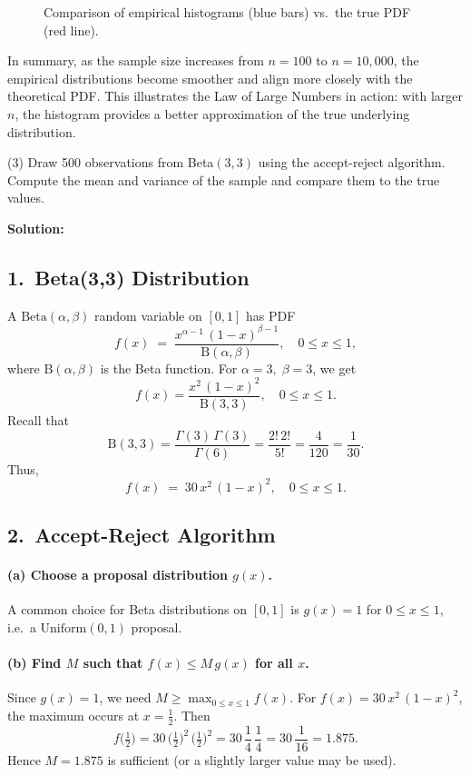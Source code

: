 \documentclass[final,11pt]{article}
\begin{document}
\begin{spacing}{1.25}
{\begin{figure}[htbp]
  \caption{Comparison of empirical histograms (blue bars) vs.\ the true PDF (red line).}
  \label{fig:comparison}
\end{figure}

In summary, as the sample size increases from \(n=100\) to \(n=10{,}000\), 
the empirical distributions become smoother and align more closely with the theoretical PDF. 
This illustrates the Law of Large Numbers in action: with larger \(n\), 
the histogram provides a better approximation of the true underlying distribution.

}




\newpage

(3) Draw 500 observations from Beta$(3,3)$ using the accept-reject algorithm. Compute the mean and variance of the sample and compare them to the true values.

{
\textbf{Solution:}


\subsection*{1.\, Beta(3,3) Distribution}
A $\mathrm{Beta}(\alpha,\beta)$ random variable on $[0,1]$ has PDF
\[
f(x) \;=\; \frac{x^{\alpha-1}\,(1-x)^{\beta-1}}{\mathrm{B}(\alpha,\beta)},
\quad 0 \le x \le 1,
\]
where $\mathrm{B}(\alpha,\beta)$ is the Beta function. For $\alpha=3,\;\beta=3$, we get
\[
f(x) 
= \frac{x^2\,(1-x)^2}{\mathrm{B}(3,3)},
\quad 0 \le x \le 1.
\]
Recall that
\[
\mathrm{B}(3,3)
= \frac{\Gamma(3)\,\Gamma(3)}{\Gamma(6)}
= \frac{2!\,2!}{5!}
= \frac{4}{120} 
= \frac{1}{30}.
\]
Thus, 
\[
f(x) \;=\; 30\,x^2\,(1-x)^2,
\quad 0 \le x \le 1.
\]

\subsection*{2.\, Accept-Reject Algorithm}

\paragraph{(a) Choose a proposal distribution $g(x)$.}
A common choice for Beta distributions on $[0,1]$ is $g(x)=1$ for $0 \le x \le 1$, i.e.\ a $\mathrm{Uniform}(0,1)$ proposal.

\paragraph{(b) Find $M$ such that $f(x) \le M\,g(x)$ for all $x$.}
Since $g(x)=1$, we need $M \ge \max_{0 \le x \le 1} f(x)$. For $f(x)=30\,x^2\,(1-x)^2$, the maximum occurs at $x=\tfrac12$. Then
\[
f\!\bigl(\tfrac12\bigr)
= 30\,\bigl(\tfrac12\bigr)^2 \,\bigl(\tfrac12\bigr)^2
= 30 \,\frac{1}{4}\,\frac{1}{4}
= 30 \,\frac{1}{16}
= 1.875.
\]
Hence $M=1.875$ is sufficient (or a slightly larger value may be used).

}
\end{spacing}
\end{document}
